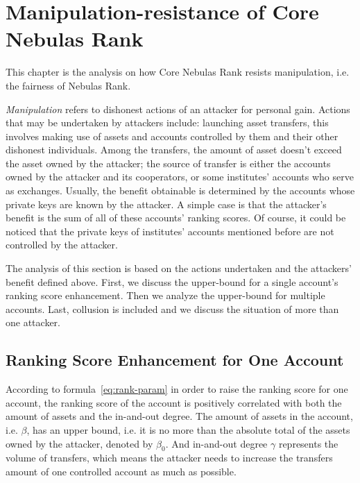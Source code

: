 
\section{Manipulation-resistance of Core Nebulas Rank}

This chapter is the analysis on how Core Nebulas Rank resists manipulation, i.e. the fairness of Nebulas Rank.

\emph{Manipulation} refers to dishonest actions of an attacker for personal gain. Actions that may be undertaken by attackers include: launching asset transfers, this involves making use of assets and accounts controlled by them and their other dishonest individuals. Among the transfers, the amount of asset doesn't exceed the asset owned by the attacker; the source of transfer is either the accounts owned by the attacker and its cooperators, or some institutes' accounts who serve as exchanges. Usually, the benefit obtainable is determined by the accounts whose private keys are known by the attacker. A simple case is that the attacker's benefit is the sum of all of these accounts' ranking scores. Of course, it could be noticed that the private keys of institutes' accounts mentioned before are not controlled by the attacker.

The analysis of this section is based on the actions undertaken and the attackers' benefit defined above. First, we discuss the upper-bound for a single account's ranking score enhancement. Then we analyze the upper-bound for multiple accounts. Last, collusion is included and we discuss the situation of more than one attacker.

\subsection{Ranking Score Enhancement for One Account \label{sec:cheat-single}}

According to formula~\ref{eq:rank-param} in order to raise the ranking score for one account, the ranking score of the account is positively correlated with both the amount of assets and the in-and-out degree. The amount of assets in the account, i.e. $\beta$, has an upper bound, i.e. it is no more than the absolute total of the assets owned by the attacker, denoted by $\beta_0$. And in-and-out degree $\gamma$ represents the volume of transfers, which means the attacker needs to increase the transfers amount of one controlled account as much as possible.

